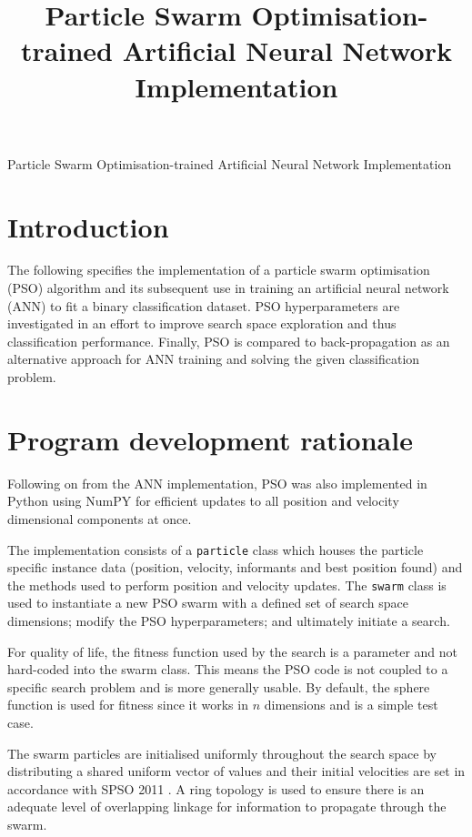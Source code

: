 \documentclass[12pt]{article}
\begin{document}
\title{Particle Swarm Optimisation-trained Artificial Neural Network Implementation}

\begin{center}
  \Large{Particle Swarm Optimisation-trained Artificial Neural Network Implementation}
\end{center}

\vspace{-2em}
\section{Introduction}
\vspace{-1.5em}

The following specifies the implementation of a particle swarm
optimisation (PSO) algorithm and its subsequent use in training an
artificial neural network (ANN) to fit a binary classification dataset.
PSO hyperparameters are investigated in an effort to improve search
space exploration and thus classification performance. Finally, PSO is compared to back-propagation as an alternative approach for ANN training and solving the given classification problem.

\vspace{-1.5em}
\section{Program development rationale}
\vspace{-1.5em}

Following on from the ANN implementation, PSO was also implemented in
Python using NumPY for efficient updates to all position and velocity
dimensional components at once.

The implementation consists of a \texttt{particle} class which houses the
particle specific instance data (position, velocity, informants and best position found) and the
methods used to perform position and velocity updates. The \texttt{swarm}
class is used to instantiate a new PSO swarm with a defined set of search space
dimensions; modify the PSO hyperparameters; and ultimately initiate a search.

For quality of life, the fitness function used by the search is a parameter
and not hard-coded into the swarm class. This means the PSO code is not coupled
to a specific search problem and is more generally usable. By default,
the sphere function is used for fitness since it works in \(n\) dimensions
and is a simple test case.

The swarm particles are initialised uniformly throughout the search space
by distributing a shared uniform vector of values and their initial velocities
are set in accordance with SPSO 2011 \cite{Clerc}. A ring topology \cite{Clerc} is used to ensure
there is an adequate level of overlapping linkage for information to propagate through
the swarm.
\end{document}
